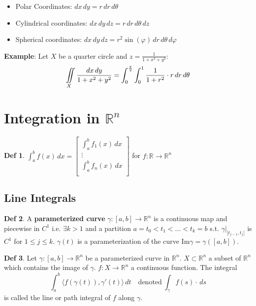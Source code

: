 \documentclass[a4paper, 10pt]{article}
\theoremstyle{definition}
\newtheorem*{definition}{Def}
\newcommand{\R}{\mathbb{R}}
\begin{document}
\begin{note*}
    \begin{itemize}[leftmargin=15pt]
        \item Polar Coordinates: \(dx \, dy = r \, dr \, d\theta\)
        \item Cylindrical coordinates: \(dx \, dy \, dz = r \, dr \, d\theta \, dz\)
        \item Spherical coordinates: \(dx \, dy \, dz = r^2 \sin(\varphi) \, dr \, d\theta \, d\varphi\)
    \end{itemize}
    \vspace{5pt}
    \textbf{Example}: Let \(X\) be a quarter circle and \(z = \frac{1}{1 + x^2 + y^2}\):
    \[\iint\displaylimits_X \frac{dx \, dy}{1 + x^2 + y^2} = \int_0^{\frac{\pi}{2}} \int_0^1 \frac{1}{1 + r^2} \cdot r \, dr \, d\theta\]
\end{note*}

\pagebreak

\section{Integration in \(\R^n\)}
\begin{definition}
    \(\int_a^b f(x) \, dx = \begin{bmatrix}
        \int_a^b f_1(x) \, dx \\
        \vdots \\
        \int_a^b f_n(x) \, dx \\
    \end{bmatrix}\) for \(f: \R \to \R^n\)
\end{definition}

\subsection{Line Integrals}
\begin{definition}
    A \textbf{parameterized curve} \(\gamma: [a, b] \to \R^n\) is a continuous map and piecewise in \(C^1\) i.e. \(\exists k > 1\) and a partition \(a = t_0 < t_1 < \ldots < t_k = b\) s.t. \(\gamma \big|_{]t_{j-1}, t_j[}\) is \(C^1\) for \(1 \leq j \leq k\). \(\gamma(t)\) is a parameterization of the curve \(\text{Im} \gamma = \gamma([a, b])\).
\end{definition}

\begin{definition}
    Let \(\gamma: [a, b] \to \R^n\) be a parameterized curve in \(\R^n\). \(X \subset \R^n\) a subset of \(\R^n\) which contains the image of \(\gamma\). \(f: X \to \R^n\) a continuous function. The integral
    \[\int_a^b \langle f(\gamma(t)), \gamma'(t)\rangle \, dt \quad \text{denoted} \ \int_\gamma f(s) \cdot \, ds\]
    is called the line or path integral of \(f\) along \(\gamma\).
\end{definition}
\end{document}

